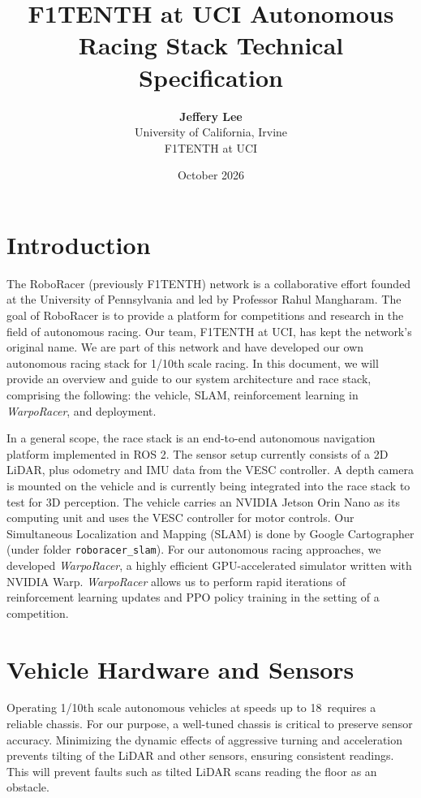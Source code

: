 \documentclass[11pt,letterpaper]{article}
\title{\Large\textbf{F1TENTH at UCI Autonomous Racing Stack Technical Specification}}
\author{\textbf{Jeffery Lee} \\ University of California, Irvine \\ F1TENTH at UCI}
\date{October 2026}
\begin{document}
\maketitle

\section{Introduction}
The RoboRacer (previously F1TENTH) network is a collaborative effort founded at the University of Pennsylvania and led by Professor Rahul Mangharam. 
The goal of RoboRacer is to provide a platform for competitions and research in the field of autonomous racing. 
Our team, F1TENTH at UCI, has kept the network's original name. We are part of this network and have developed our own autonomous racing stack for 1/10th scale racing. 
In this document, we will provide an overview and guide to our system architecture and race stack, comprising the following: the vehicle, SLAM, reinforcement learning in \textit{WarpoRacer}, and deployment.

In a general scope, the race stack is an end-to-end autonomous navigation platform implemented in ROS 2. The sensor setup currently consists of a 2D LiDAR, plus odometry and IMU data from the VESC controller. A depth camera is mounted on the vehicle and is currently being integrated into the race stack to test for 3D perception.
The vehicle carries an NVIDIA Jetson Orin Nano as its computing unit and uses the VESC controller for motor controls.
Our Simultaneous Localization and Mapping (SLAM) is done by Google Cartographer (under folder \texttt{roboracer\_slam}). 
For our autonomous racing approaches, we developed \textit{WarpoRacer}, a highly efficient GPU-accelerated simulator written with NVIDIA Warp.
\textit{WarpoRacer} allows us to perform rapid iterations of reinforcement learning updates and PPO policy training in the setting of a competition.

\vspace{1em}

\section{Vehicle Hardware and Sensors}
Operating 1/10th scale autonomous vehicles at speeds up to 18\, requires a reliable chassis. For our purpose, a well-tuned chassis is critical to preserve sensor accuracy.
Minimizing the dynamic effects of aggressive turning and acceleration prevents tilting of the LiDAR and other sensors, ensuring consistent readings. This will prevent faults such as tilted LiDAR scans reading the floor as an obstacle.
\end{document}

